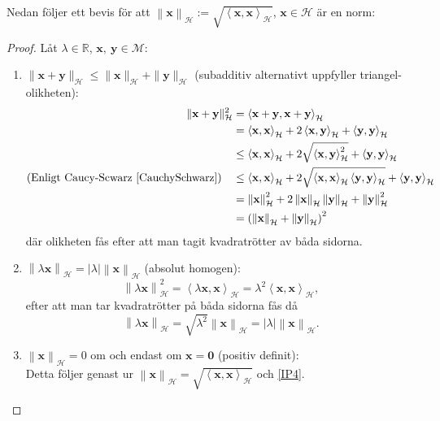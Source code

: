 \documentclass[a4paper, 12pt]{report}
\theoremstyle{definition}
\theoremstyle{remark}
\newcommand{\bfx}{\mathbf{x}}
\newcommand{\llangle}{\left\langle}
\newcommand{\rrangle}{\right\rangle}
\begin{document}
Nedan följer ett bevis för att $\left\| \bfx \right\|_\mathcal{H} := \sqrt{\llangle \bfx , \bfx \rrangle_\mathcal{H}}$, $\bfx \in\mathcal{H}$ är en norm:
\begin{proof}
	Låt $\lambda \in \mathbb{R}$, $\bfx,~\mathbf{y}\in \mathcal{M}$:
	\begin{enumerate}[label=\textbf{N\arabic*}:]
		\item $\| \bfx + \mathbf{y}\|_\mathcal{H} \leq \| \bfx \|_\mathcal{H} + \| \mathbf{y}\|_\mathcal{H}$ (subadditiv alternativt uppfyller triangel-olikheten): 
		\begin{align*}
			\| \bfx + \mathbf{y}\|_\mathcal{H}^2 &= \llangle \bfx + \mathbf{y}, \bfx + \mathbf{y}\rrangle_\mathcal{H}\\
			&= \llangle \bfx, \bfx \rrangle_\mathcal{H} + 2 \llangle \bfx, \mathbf{y}\rrangle_\mathcal{H} + \llangle \mathbf{y}, \mathbf{y} \rrangle_\mathcal{H}\\
			&\leq \llangle \bfx, \bfx \rrangle_\mathcal{H} + 2\sqrt{\llangle \bfx, \mathbf{y}\rrangle^2_\mathcal{H}} + \llangle \mathbf{y}, \mathbf{y} \rrangle_\mathcal{H}\\
			\text{(Enligt Caucy-Scwarz \ref{CauchySchwarz})}\quad&\leq \llangle \bfx, \bfx \rrangle_\mathcal{H} + 2\sqrt{\llangle \bfx, \bfx\rrangle_ \mathcal{H} \llangle \mathbf{y}, \mathbf{y} \rrangle_\mathcal{H}} + \llangle \mathbf{y}, \mathbf{y} \rrangle_\mathcal{H}\\
			&=\left\|\bfx \right\|^2_\mathcal{H} + 2\left\|\bfx \right\|_\mathcal{H}\left\|\mathbf{y} \right\|_\mathcal{H}  + \left\| \mathbf{y}\right\|^2_\mathcal{H}\\
			&= \left(\left\|\bfx \right\|_\mathcal{H}+ \left\| \mathbf{y}\right\|_\mathcal{H}\right)^2
		\end{align*}
		där olikheten fås efter att man tagit kvadratrötter av båda sidorna.
		\item $\left\| \lambda\bfx \right\|_\mathcal{H} = \left|\lambda\right|\left\| \bfx \right\|_\mathcal{H}$ (absolut homogen):
		\begin{equation}
			\left\| \lambda\bfx \right\|_\mathcal{H}^2 = \llangle \lambda \bfx, \bfx \rrangle_\mathcal{H}
			= \lambda^2 \llangle \bfx, \bfx \rrangle_\mathcal{H},
		\end{equation}
		efter att man tar kvadratrötter på båda sidorna fås då
		\begin{equation*}
			\left\| \lambda\bfx \right\|_\mathcal{H} = \sqrt{\lambda^2}\left\| \bfx \right\|_\mathcal{H} = \left|\lambda\right| \left\| \bfx \right\|_\mathcal{H}.
		\end{equation*}
		\item $\left\| \bfx \right\|_\mathcal{H}=0$ om och endast om $\bfx = \mathbf{0}$ (positiv definit):\\
		Detta följer genast ur $\left\| \bfx \right\|_\mathcal{H} = \sqrt{\llangle \bfx, \bfx \rrangle_\mathcal{H}}$ och \ref{IP4}. \qedhere
	\end{enumerate}
\end{proof}
\end{document}
